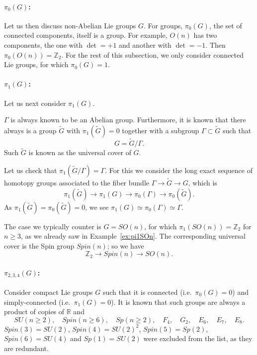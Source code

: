 \documentclass[12pt]{article}
\numberwithin{equation}{section}
\theoremstyle{remark}
\def\bR{\mathbb{R}}
\def\bZ{\mathbb{Z}}
\begin{document}
\paragraph{$\pi_0(G)$:}
Let us then discuss non-Abelian Lie groups $G$.
For groups, $\pi_0(G)$, the set of connected components, itself is a group.
For example, $O(n)$ has two components,
the one with $\det=+1$ and another with $\det=-1$.
Then $\pi_0(O(n))=\bZ_2$. 
For the rest of this subsection, we only consider connected Lie groups,
for which $\pi_0(G)=1$.

\paragraph{$\pi_1(G)$:}
Let us next consider $\pi_1(G)$. 
\begin{fact}
$\Gamma$ is always known to be an Abelian group.
Furthermore, it is known that there always is a group $\tilde G$ with $\pi_1(\tilde G)=0$
together with a subgroup $\Gamma \subset \tilde G$ such that \begin{equation}
G=\tilde G/\Gamma.
\end{equation}
Such $\tilde G$ is known as the universal cover of $G$.
\end{fact}
Let us check that $\pi_1(\tilde G/\Gamma)=\Gamma$.
For this we consider the long exact sequence of homotopy groups associated to 
the fiber bundle $\Gamma\to \tilde G\to G$, which is \begin{equation}
\pi_1(\tilde G)\to \pi_1(G)\to \pi_0(\Gamma)\to \pi_0(\tilde G).
\end{equation}
As $\pi_1(\tilde G)=\pi_0(\tilde G)=0$, we see $\pi_1(G)\simeq \pi_0(\Gamma)\simeq \Gamma$.

The case we typically counter is $G=SO(n)$, for which $\pi_1(SO(n))=\bZ_2$ for $n\ge 3$, as we already saw in Example~\ref{ex:pi1SOn}.
The corresponding universal cover is the Spin group $Spin(n)$;
so we have \begin{equation}
\bZ_2 \to Spin(n)\to SO(n).
\end{equation}

\paragraph{$\pi_{2,3,4}(G)$:}
Consider compact Lie groups $G$ such that 
it is connected (i.e.~$\pi_0(G)=0$)
and simply-connected (i.e.~$\pi_1(G)=0$).
It is known that such groups are always a product of copies of
$\bR$ and \begin{equation}
SU(n\ge 2),\quad
Spin(n\ge 6),\quad
Sp(n\ge 2),\quad
F_4,\quad
G_2,\quad
E_6,\quad
E_7,\quad
E_8.
\label{eq:list-simple-Lie}
\end{equation}
$Spin(3)=SU(2)$, $Spin(4)=SU(2)^2$, $Spin(5)=Sp(2)$, $Spin(6)=SU(4)$
 and $Sp(1)=SU(2)$ 
were excluded from the list, as they are redundant.
\end{document}
